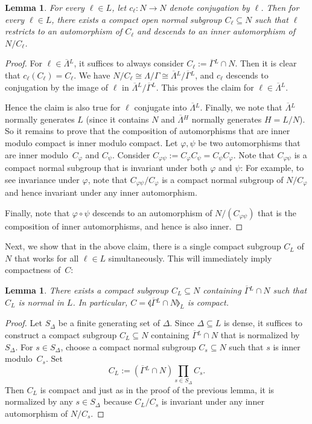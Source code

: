 \documentclass[11pt]{article}
\numberwithin{equation}{section}\providecommand{\llangle}{\langle\!\langle}\providecommand{\rrangle}{\rangle\!\rangle}\providecommand{\Asterisk}{\ast}
\newcommand{\oGL}{\ensuremath{\overline{\Gamma}{}^L}}
\newcommand{\oLL}{\ensuremath{\overline{\Lambda}{}^L}}
\newcommand{\oLH}{\ensuremath{\overline{\Lambda}{}^H}}
\newtheorem{lemma}[thm]{Lemma}
\theoremstyle{definition}
\begin{document}
\begin{lemma}\label{lemma:innermodcmpt}
For every $\ell\in L$, let $c_\ell:N\to N$ denote conjugation by $\ell$. Then for every $\ell\in L$, there exists a compact open normal subgroup $C_\ell\subseteq N$ such that $\ell$ restricts to an automorphism of $C_\ell$ and descends to an inner automorphism of $N/C_\ell$.
\end{lemma}
\begin{proof} For $\ell\in\oLL$, it suffices to always consider $C_\ell:=\oGL\cap N$. Then it is clear that $c_\ell(C_\ell)=C_\ell$. We have $N/C_\ell \cong \Lambda/\Gamma\cong \oLL/\oGL$, and $c_\ell$ descends to conjugation by the image of $\ell$ in $\oLL/\oGL$. This proves the claim for $\ell\in\oLL$.

Hence the claim is also true for $\ell$ conjugate into $\oLL$. Finally, we note that $\oLL$ normally generates $L$ (since it contains $N$ and $\oLH$ normally generates $H=L/N$). So it remains to prove that the composition of automorphisms that are inner modulo compact is inner modulo compact. Let $\varphi,\psi$ be two automorphisms that are inner modulo~$C_\varphi$ and $C_\psi$. Consider $C_{\varphi\psi}:=C_\varphi C_\psi = C_\psi C_\varphi$. Note that $C_{\varphi\psi}$ is a compact normal subgroup that is invariant under both $\varphi$ and $\psi$: For example, to see invariance under $\varphi$, note that $C_{\varphi\psi}/ C_\varphi$ is a compact normal subgroup of $N/C_\varphi$ and hence invariant under any inner automorphism.

Finally, note that $\varphi\circ \psi$ descends to an automorphism of $N/(C_{\varphi\psi})$ that is the composition of inner automorphisms, and hence is also inner.\end{proof}

Next, we show that in the above claim, there is a single compact subgroup $C_L$ of~$N$ that works for all $\ell\in L$ simultaneously. This will immediately imply compactness of~$C$:

\begin{lemma}\label{lemma:c-cmpt}
There exists a compact subgroup $C_L\subseteq N$ containing $\oGL\cap N$ such that $C_L$ is normal in $L$. In particular, $C=\llangle \oGL\cap N\rrangle_L$ is compact.
\end{lemma}
\begin{proof} Let $S_\Delta$ be a finite generating set of $\Delta$. Since $\Delta\subseteq L$ is dense, it suffices to construct a compact subgroup $C_L\subseteq N$ containing $\oGL\cap N$ that is normalized by~$S_\Delta$. For $s\in S_\Delta$, choose a compact normal subgroup $C_s\subseteq N$ such that $s$ is inner modulo~$C_s$. Set
\[
C_L:=(\oGL\cap N)\prod_{s\in S_\Delta} C_s.
\]
Then $C_L$ is compact and just as in the proof of the previous lemma, it is normalized by any $s\in S_\Delta$ because $C_L/C_s$ is invariant under any inner automorphism of $N/C_s$.\end{proof}
\end{document}
